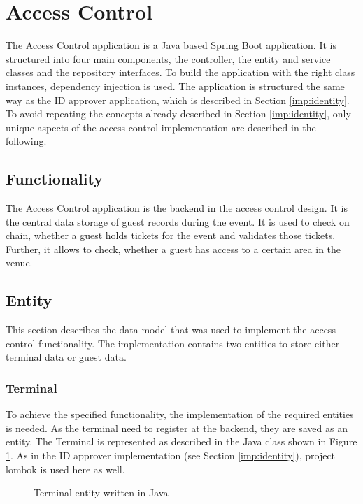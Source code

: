 \section{Access Control}
The Access Control application is a Java based Spring Boot application. It is structured into four main components, the controller, the entity and service classes and the repository interfaces. To build the application with the right class instances, dependency injection is used. The application is structured the same way as the ID approver application, which is described in Section \ref{imp:identity}. To avoid repeating the concepts already described in Section \ref{imp:identity}, only unique aspects of the access control implementation are described in the following.

\subsection{Functionality}
The Access Control application is the backend in the access control design. It is the central data storage of guest records during the event. It is used to check on chain, whether a guest holds tickets for the event and validates those tickets. Further, it allows to check, whether a guest has access to a certain area in the venue.

\subsection{Entity}
This section describes the data model that was used to implement the access control functionality. The implementation contains two entities to store either terminal data or guest data.

\subsubsection{Terminal}
To achieve the specified functionality, the implementation of the required entities is needed. As the terminal need to register at the backend, they are saved as an entity. The Terminal is represented as described in the Java class shown in Figure \ref{code:entity:access}. As in the ID approver implementation (see Section \ref{imp:identity}), project lombok is used here as well.

\begin{figure}[H]
    
    \caption{Terminal entity written in Java}
    \label{code:entity:access}
\end{figure}

